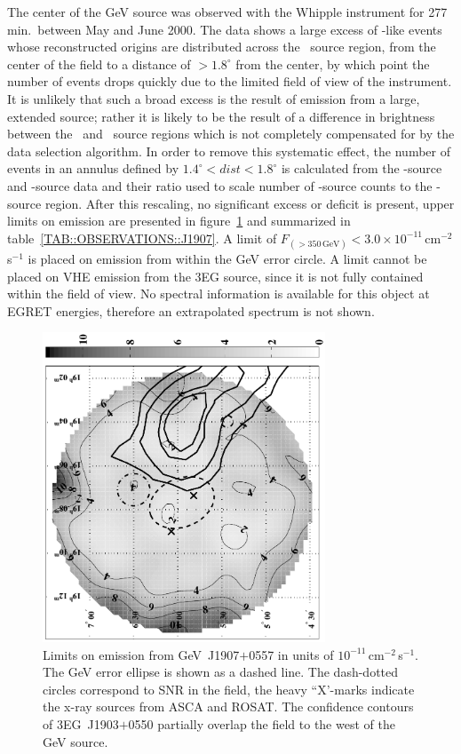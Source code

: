 The center of the GeV source was observed with the Whipple instrument
for 277\,min.\ between May and June 2000. The data shows a large
excess of {\Grayc}-like events whose reconstructed origins are
distributed across the \On\ source region, from the center of the
field to a distance of $>1.8^\circ$ from the center, by which point
the number of events drops quickly due to the limited field of view of
the instrument. It is unlikely that such a broad excess is the result
of \Gray emission from a large, extended source; rather it is likely
to be the result of a difference in brightness between the \On\ and
\Off\ source regions which is not completely compensated for by the
data selection algorithm. In order to remove this systematic effect,
the number of events in an annulus defined by
$1.4^\circ<dist<1.8^\circ$ is calculated from the \On-source and
\Off-source data and their ratio used to scale number of \Off-source
counts to the \On-source region. After this rescaling, no significant
excess or deficit is present, upper limits on \Gray emission are
presented in figure~\ref{FIG::OBSERVATIONS::J1907UL} and summarized in
table~\ref{TAB::OBSERVATIONS::J1907}. A limit of
$F_{(>350\,\mathrm{GeV})}<3.0\times10^{-11}$\,cm$^{-2}$\,s$^{-1}$ is
placed on emission from within the GeV error circle. A limit cannot be
placed on VHE emission from the 3EG source, since it is not fully
contained within the field of view. No spectral information is
available for this object at EGRET energies, therefore an extrapolated
spectrum is not shown. 

\begin{figure}[p]
\centerline{\includegraphics[draft=false,angle=270,width=0.75\textwidth]{plots/chap-observations/loenergy/J1907+0557_sul_conv_bw.pdf}}
\caption{\label{FIG::OBSERVATIONS::J1907UL} Limits on emission 
from GeV~J1907$+$0557 in units of $10^{-11}$\,cm$^{-2}$\,s$^{-1}$. The
GeV error ellipse is shown as a dashed line.  The dash-dotted
circles correspond to SNR in the field, the heavy ``X'-marks indicate
the x-ray sources from ASCA and ROSAT. The confidence contours of
3EG~J1903$+$0550 partially overlap the field to the west of the GeV
source.}
\end{figure}

